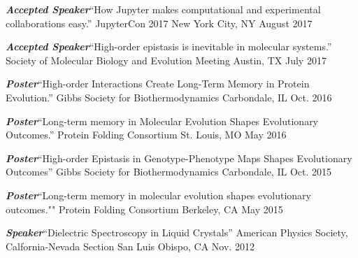 

\begin{cvpresentations}


  \cvpresentation
    {\textbf{\textit{Accepted Speaker}}{\enskip\cdotp\enskip}``How Jupyter makes computational and experimental collaborations easy.''} %
    {JupyterCon 2017} %
    {New York City, NY} %
    {August 2017} %

  \cvpresentation
    {\textbf{\textit{Accepted Speaker}}{\enskip\cdotp\enskip}``High-order epistasis is inevitable in molecular systems.''} %
    {Society of Molecular Biology and Evolution Meeting} %
    {Austin, TX} %
    {July 2017} %

  \cvpresentation
    {\textbf{\textit{Poster}}{\enskip\cdotp\enskip}``High-order Interactions Create Long-Term Memory in Protein Evolution.''} %
    {Gibbs Society for Biothermodynamics} %
    {Carbondale, IL} %
    {Oct. 2016} %


  \cvpresentation
    {\textbf{\textit{Poster}}{\enskip\cdotp\enskip}``Long-term memory in Molecular Evolution Shapes Evolutionary Outcomes.''} %
    {Protein Folding Consortium} %
    {St. Louis, MO} %
    {May 2016} %

  \cvpresentation
    {\textbf{\textit{Poster}}{\enskip\cdotp\enskip}``High-order Epistasis in Genotype-Phenotype Maps Shapes Evolutionary Outcomes''} %
    {Gibbs Society for Biothermodynamics} %
    {Carbondale, IL} %
    {Oct. 2015} %

  \cvpresentation
    {\textbf{\textit{Poster}}{\enskip\cdotp\enskip}``Long-term memory in molecular evolution shapes evolutionary outcomes.""} %
    {Protein Folding Consortium} %
    {Berkeley, CA} %
    {May 2015} %

  \cvpresentation
    {\textbf{\textit{Speaker}}{\enskip\cdotp\enskip}``Dielectric Spectroscopy in Liquid Crystals''} %
    {American Physics Society, Calfornia-Nevada Section} %
    {San Luis Obispo, CA} %
    {Nov. 2012} %

\end{cvpresentations}
